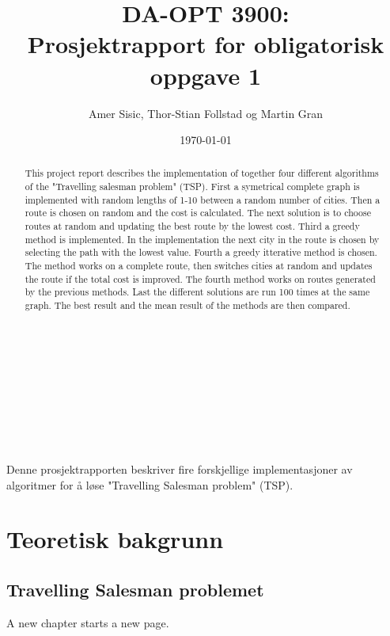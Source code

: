 \documentclass[notitlepage]{article}
\title{DA-OPT 3900:\\Prosjektrapport for obligatorisk oppgave 1}
\author{Amer Sisic, Thor-Stian Follstad og Martin Gran}
\date{\today}
\begin{document}
\setcounter{section}{1}

\maketitle
\thispagestyle{myheadings}
\vspace{\fill}
\begin{abstract}
This project report describes the implementation of together four different algorithms of the "Travelling salesman problem" (TSP).
First a symetrical complete graph is implemented with random lengths of 1-10 between a random number of cities. Then a route is 
chosen on random and the cost is calculated. The next solution is to choose routes at random and updating the best route by the 
lowest cost. Third a greedy method is implemented. In the implementation the next city in the route is chosen by selecting
the path with the lowest value. Fourth a greedy itterative method is chosen. The method works on a complete route, then switches
cities at random and updates the route if the total cost is improved. The fourth method works on routes generated by the previous
methods. Last the different solutions are run 100 times at the same graph. The best result and the mean result of the methods are then compared.  
\\ \\ \\ \\ \\ \\ \\ \\ \\
\end{abstract}
\vspace{\fill}
\pagebreak
\thispagestyle{empty}%
\tableofcontents
\pagebreak
{}
\indent Denne prosjektrapporten beskriver fire forskjellige implementasjoner av algoritmer for å løse "Travelling Salesman problem" (TSP).

\pagebreak

\section{Teoretisk bakgrunn}
\subsection{Travelling Salesman problemet}
A new chapter starts a new page.  
\end{document}

